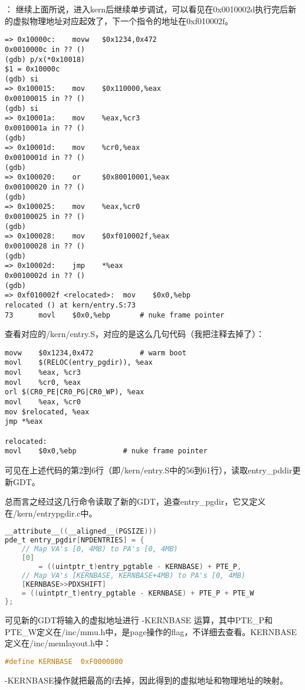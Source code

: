 \documentclass[a4paper, 11pt]{ctexart}
\begin{document}
\color{red}{练习7}：\color{black}
继续上面所说，进入kern后继续单步调试，可以看见在0x0010002d执行完后新的虚拟物理地址对应起效了，下一个指令的地址在0xf010002f。
\begin{lstlisting}[numbers=none]
=> 0x10000c:	movw   $0x1234,0x472
0x0010000c in ?? ()
(gdb) p/x(*0x10018)
$1 = 0x10000c
(gdb) si
=> 0x100015:	mov    $0x110000,%eax
0x00100015 in ?? ()
(gdb) si
=> 0x10001a:	mov    %eax,%cr3
0x0010001a in ?? ()
(gdb) 
=> 0x10001d:	mov    %cr0,%eax
0x0010001d in ?? ()
(gdb) 
=> 0x100020:	or     $0x80010001,%eax
0x00100020 in ?? ()
(gdb) 
=> 0x100025:	mov    %eax,%cr0
0x00100025 in ?? ()
(gdb) 
=> 0x100028:	mov    $0xf010002f,%eax
0x00100028 in ?? ()
(gdb) 
=> 0x10002d:	jmp    *%eax
0x0010002d in ?? ()
(gdb) 
=> 0xf010002f <relocated>:	mov    $0x0,%ebp
relocated () at kern/entry.S:73
73		movl	$0x0,%ebp		# nuke frame pointer
\end{lstlisting}

查看对应的/kern/entry.S，对应的是这么几句代码（我把注释去掉了）：
\begin{lstlisting}[language={[x86masm]Assembler}]
movw	$0x1234,0x472			# warm boot
movl	$(RELOC(entry_pgdir)), %eax
movl	%eax, %cr3
movl	%cr0, %eax
orl	$(CR0_PE|CR0_PG|CR0_WP), %eax
movl	%eax, %cr0
mov	$relocated, %eax
jmp	*%eax

relocated:
movl	$0x0,%ebp			# nuke frame pointer
\end{lstlisting}

可见在上述代码的第2到6行（即/kern/entry.S中的56到61行），读取entry\_pddir更新GDT。

总而言之经过这几行命令读取了新的GDT，追查entry\_pgdir，它又定义在/kern/entrypgdir.c中。
\begin{lstlisting}[language={C}]
__attribute__((__aligned__(PGSIZE)))
pde_t entry_pgdir[NPDENTRIES] = {
	// Map VA's [0, 4MB) to PA's [0, 4MB)
	[0]
		= ((uintptr_t)entry_pgtable - KERNBASE) + PTE_P,
	// Map VA's [KERNBASE, KERNBASE+4MB) to PA's [0, 4MB)
	[KERNBASE>>PDXSHIFT]
	= ((uintptr_t)entry_pgtable - KERNBASE) + PTE_P + PTE_W
};
\end{lstlisting}

可见新的GDT将输入的虚拟地址进行 -KERNBASE 运算，其中PTE\_P和PTE\_W定义在/inc/mmu.h中，是page操作的flag，不详细去查看。KERNBASE定义在/inc/memlayout.h中：
\begin{lstlisting}[language={C},numbers=none]
#define KERNBASE  0xF0000000
\end{lstlisting}

-KERNBASE操作就把最高的f去掉，因此得到的虚拟地址和物理地址的映射。
\end{document}
